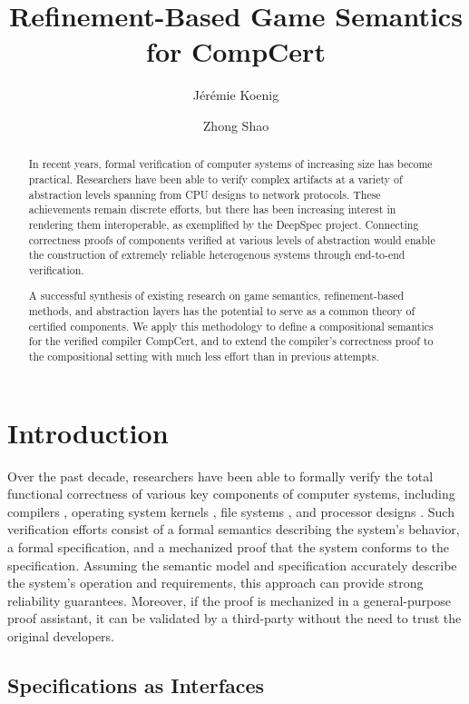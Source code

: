 \documentclass[sigplan,10pt,review,anonymous]{acmart}
\title{Refinement-Based Game Semantics for CompCert}
\author{J\'er\'emie Koenig}
\affiliation{Yale University}
\author{Zhong Shao}
\affiliation{Yale University}
\begin{document}
\begin{abstract} %
In recent years,
formal verification of computer systems
of increasing size has become practical.
Researchers have been able to verify complex artifacts
at a variety of abstraction levels spanning
from CPU designs to network protocols.
These achievements remain discrete efforts, but
there has been increasing interest in rendering them interoperable,
as exemplified by the DeepSpec project.
Connecting correctness proofs of components
verified at various levels of abstraction
would enable the construction of extremely reliable heterogenous systems
through end-to-end verification.

A successful synthesis of existing research on
game semantics,
refinement-based methods, and
abstraction layers
has the potential to serve as a common theory
of certified components.
We apply this methodology to define
a compositional semantics for the verified compiler
CompCert,
and to extend
the compiler's correctness proof
to the compositional setting
with much less effort than in previous attempts.
\end{abstract}

\maketitle

\section{Introduction} %


Over the past decade,
researchers have been able to formally verify the
total functional correctness
of various key components of computer systems,
including
compilers \cite{compcert, vellvm},
operating system kernels \cite{sel4, popl15},
file systems \cite{fscq}, and
processor designs \cite{safe}.
Such verification efforts
consist of
a formal semantics describing the system's behavior,
a formal specification,
and a mechanized proof that
the system conforms to the specification.
Assuming the semantic model and specification accurately describe
the system's operation and requirements,
this approach can provide
strong reliability guarantees.
Moreover,
if the proof is mechanized in a general-purpose proof assistant,
it can be validated by a third-party
without the need to trust the original developers.


\subsection{Specifications as Interfaces} %
\end{document}
